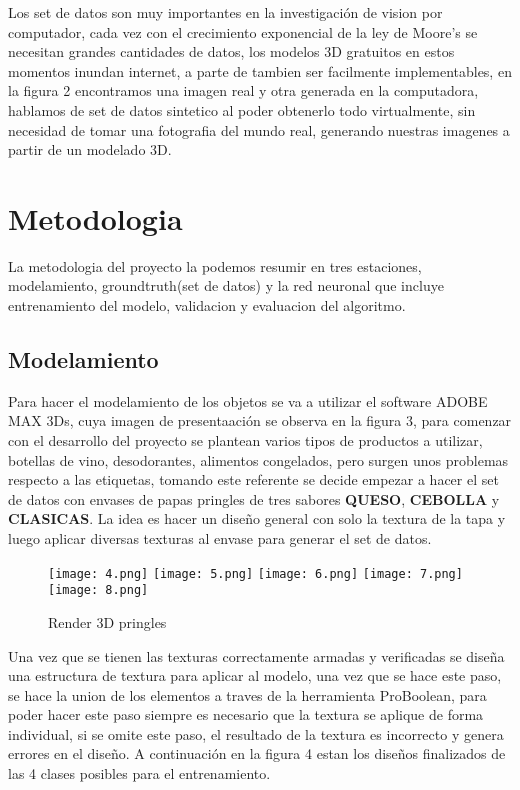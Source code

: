 \documentclass[conference]{IEEEtran}
\begin{document}
 Los set de datos son muy importantes en la investigaci\'on de vision por computador, cada vez con el crecimiento exponencial de la ley de Moore's se necesitan grandes cantidades de datos, los modelos 3D gratuitos en estos momentos inundan internet, a parte de tambien ser facilmente implementables, en la figura 2 encontramos una imagen real y otra generada en la computadora, hablamos de set de datos sintetico al poder obtenerlo todo virtualmente, sin necesidad de tomar una fotografia del mundo real, generando nuestras imagenes a partir de un modelado 3D.
 
\section{Metodologia}

La metodologia del proyecto la podemos resumir en tres estaciones, modelamiento, groundtruth(set de datos) y la red neuronal que incluye entrenamiento del modelo, validacion y evaluacion del algoritmo. 

\subsection{Modelamiento}

Para hacer el modelamiento de los objetos se va a utilizar el software ADOBE MAX 3Ds, cuya imagen de presentaaci\'on se observa en la figura 3, para comenzar con el desarrollo del proyecto se plantean varios tipos de productos a utilizar, botellas de vino, desodorantes, alimentos congelados, pero surgen unos problemas respecto a las etiquetas, tomando este referente se decide empezar a hacer el set de datos con envases de papas pringles de tres sabores \textbf{QUESO}, \textbf{CEBOLLA} y \textbf{CLASICAS}. La idea es hacer un diseño general con solo la textura de la tapa y luego aplicar diversas texturas al envase para generar el set de datos.
\begin{figure}[H]
	\centering
	\texttt{[image: 4.png]}
    \texttt{[image: 5.png]}
	\texttt{[image: 6.png]}
	\texttt{[image: 7.png]}
	\texttt{[image: 8.png]}
	\caption{Render 3D pringles}
	\label{fig:Resultado GAN}
\end{figure}

Una vez que se tienen las texturas correctamente armadas y verificadas se diseña una estructura de textura para aplicar al modelo, una vez que se hace este paso, se hace la union de los elementos a traves de la herramienta ProBoolean, para poder hacer este paso siempre es necesario que la textura se aplique de forma individual, si se omite este paso, el resultado de la textura es incorrecto y genera errores en el diseño. A continuaci\'on en la figura 4 estan los diseños finalizados de las 4 clases posibles para el entrenamiento.
\end{document}
